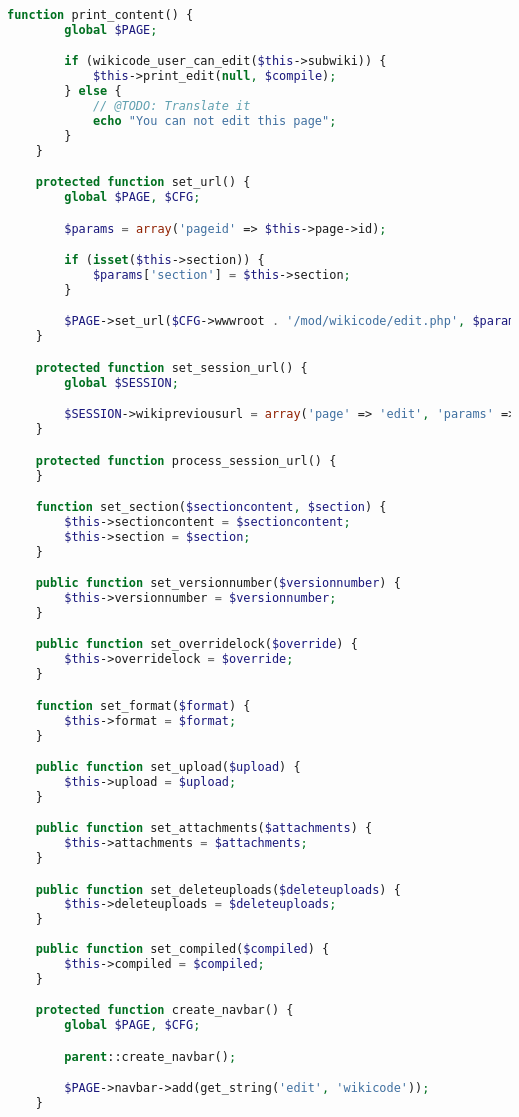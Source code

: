 \begin{lstlisting}[language=PHP]
    function print_content() {
        global $PAGE;

        if (wikicode_user_can_edit($this->subwiki)) {
            $this->print_edit(null, $compile);
        } else {
            // @TODO: Translate it
            echo "You can not edit this page";
        }
    }

    protected function set_url() {
        global $PAGE, $CFG;

        $params = array('pageid' => $this->page->id);

        if (isset($this->section)) {
            $params['section'] = $this->section;
        }

        $PAGE->set_url($CFG->wwwroot . '/mod/wikicode/edit.php', $params);
    }

    protected function set_session_url() {
        global $SESSION;

        $SESSION->wikipreviousurl = array('page' => 'edit', 'params' => array('pageid' => $this->page->id, 'section' => $this->section));
    }

    protected function process_session_url() {
    }

    function set_section($sectioncontent, $section) {
        $this->sectioncontent = $sectioncontent;
        $this->section = $section;
    }

    public function set_versionnumber($versionnumber) {
        $this->versionnumber = $versionnumber;
    }

    public function set_overridelock($override) {
        $this->overridelock = $override;
    }

    function set_format($format) {
        $this->format = $format;
    }

    public function set_upload($upload) {
        $this->upload = $upload;
    }

    public function set_attachments($attachments) {
        $this->attachments = $attachments;
    }

    public function set_deleteuploads($deleteuploads) {
        $this->deleteuploads = $deleteuploads;
    }
	
	public function set_compiled($compiled) {
		$this->compiled = $compiled;
	}

    protected function create_navbar() {
        global $PAGE, $CFG;

        parent::create_navbar();

        $PAGE->navbar->add(get_string('edit', 'wikicode'));
    }


\end{lstlisting}
